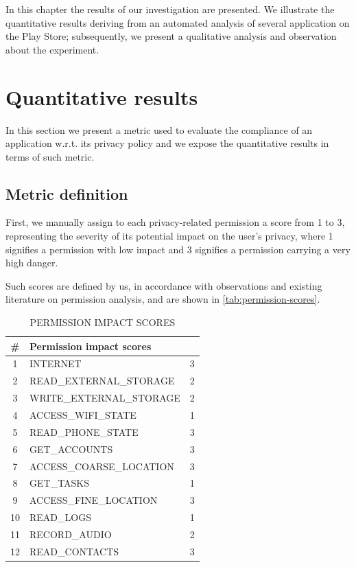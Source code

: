 
In this chapter the results of our investigation are presented. We illustrate the quantitative results deriving from an automated analysis of several application on the Play Store; subsequently, we present a qualitative analysis and observation about the experiment.

\section{Quantitative results}
\label{sec:results}
In this section we present a metric used to evaluate the compliance of an application w.r.t. its privacy policy and we expose the quantitative results in terms of such metric.

\subsection{Metric definition}
\label{sec:metric}
First, we manually assign to each privacy-related permission a score from 1 to 3, representing the severity of its potential impact on the user's privacy, where 1 signifies a permission with low impact and 3 signifies a permission carrying a very high danger.

Such scores are defined by us, in accordance with observations and existing literature on permission analysis,
and are shown in \autoref{tab:permission-scores}.

\begin{table}[ht]
    \caption{PERMISSION IMPACT SCORES}
    \label{tab:permission-scores}
    \centering
    \begin{tabular}{clc}
        \toprule
            \#   & Permission impact scores \\
            \midrule
                1  & INTERNET                       &   3 \\
                2  & READ\_EXTERNAL\_STORAGE        &   2 \\
                3  & WRITE\_EXTERNAL\_STORAGE       &   2 \\
                4  & ACCESS\_WIFI\_STATE            &   1 \\
                5  & READ\_PHONE\_STATE             &   3 \\
                6  & GET\_ACCOUNTS                  &   3 \\
                7  & ACCESS\_COARSE\_LOCATION      	&   3 \\
                8  & GET\_TASKS                     &   1 \\
                9  & ACCESS\_FINE\_LOCATION         &   3 \\
                10 & READ\_LOGS                     &   1 \\
                11 & RECORD\_AUDIO                  &   2 \\
                12 & READ\_CONTACTS                 &   3 \\
        \bottomrule
    \end{tabular}
\end{table}

